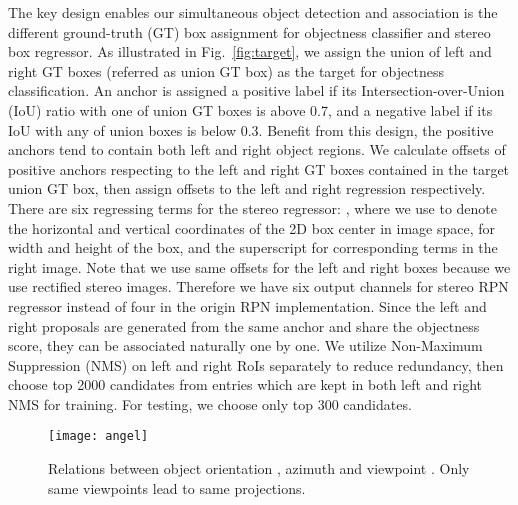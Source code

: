 \documentclass[10pt,twocolumn,letterpaper]{article}
\begin{document}
	The key design enables our simultaneous object detection and association is the different ground-truth (GT) box assignment for objectness classifier and stereo box regressor. As illustrated in Fig.~\ref{fig:target}, we assign the union of left and right GT boxes (referred as union GT box) as the target for objectness classification. An anchor is assigned a positive label if its Intersection-over-Union (IoU) ratio with one of union GT boxes is above 0.7, and a negative label if its IoU with any of union boxes is below 0.3. Benefit from this design, the positive anchors tend to contain both left and right object regions. We calculate offsets of positive anchors respecting to the left and right GT boxes contained in the target union GT box, then assign offsets to the left and right regression respectively. There are six regressing terms for the stereo regressor: , where we use  to denote the horizontal and vertical coordinates of the 2D box center in image space,  for width and height of the box, and the superscript  for corresponding terms in the right image. Note that we use same  offsets  for the left and right boxes because we use rectified stereo images. Therefore we have six output channels for stereo RPN regressor instead of four in the origin RPN implementation. Since the left and right proposals are generated from the same anchor and share the objectness score, they can be associated naturally one by one. We utilize Non-Maximum Suppression (NMS) on left and right RoIs separately to reduce redundancy, then choose top 2000 candidates from entries which are kept in both left and right NMS for training. For testing, we choose only top 300 candidates.
	
	\begin{figure}
		\begin{center}
			\texttt{[image: angel]}
		\end{center}
		\caption{Relations between object orientation , azimuth  and viewpoint . Only same viewpoints lead to same projections.}
		\label{fig:angle}
	\end{figure}
	
\end{document}

